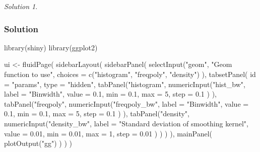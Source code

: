 \documentclass[
]{book}
\newenvironment{Shaded}{\begin{snugshade}}{\end{snugshade}}
\newcommand{\AttributeTok}[1]{\textcolor[rgb]{0.77,0.63,0.00}{#1}}
\newcommand{\DecValTok}[1]{\textcolor[rgb]{0.00,0.00,0.81}{#1}}
\newcommand{\FloatTok}[1]{\textcolor[rgb]{0.00,0.00,0.81}{#1}}
\newcommand{\FunctionTok}[1]{\textcolor[rgb]{0.00,0.00,0.00}{#1}}
\newcommand{\NormalTok}[1]{#1}
\newcommand{\OtherTok}[1]{\textcolor[rgb]{0.56,0.35,0.01}{#1}}
\newcommand{\StringTok}[1]{\textcolor[rgb]{0.31,0.60,0.02}{#1}}
\theoremstyle{definition}
\theoremstyle{definition}
\theoremstyle{definition}
\theoremstyle{definition}
\theoremstyle{remark}
\newtheorem*{solution}{Solution}
\begin{document}
\begin{solution}
\leavevmode

\hypertarget{solution-35}{%
\subsubsection*{Solution}\label{solution-35}}

\begin{Shaded}
\begin{Highlighting}[]
\FunctionTok{library}\NormalTok{(shiny)}
\FunctionTok{library}\NormalTok{(ggplot2)}

\NormalTok{ui }\OtherTok{\textless{}{-}} \FunctionTok{fluidPage}\NormalTok{(}
  \FunctionTok{sidebarLayout}\NormalTok{(}
    \FunctionTok{sidebarPanel}\NormalTok{(}
      \FunctionTok{selectInput}\NormalTok{(}\StringTok{"geom"}\NormalTok{, }\StringTok{"Geom function to use"}\NormalTok{, }
        \AttributeTok{choices =} \FunctionTok{c}\NormalTok{(}\StringTok{"histogram"}\NormalTok{, }\StringTok{"freqpoly"}\NormalTok{, }\StringTok{"density"}\NormalTok{)}
\NormalTok{      ),}
      \FunctionTok{tabsetPanel}\NormalTok{(}
        \AttributeTok{id =} \StringTok{"params"}\NormalTok{,}
        \AttributeTok{type =} \StringTok{"hidden"}\NormalTok{,}
        \FunctionTok{tabPanel}\NormalTok{(}\StringTok{"histogram"}\NormalTok{,}
          \FunctionTok{numericInput}\NormalTok{(}\StringTok{"hist\_bw"}\NormalTok{, }
            \AttributeTok{label =} \StringTok{"Binwidth"}\NormalTok{, }\AttributeTok{value =} \FloatTok{0.1}\NormalTok{, }
            \AttributeTok{min =} \FloatTok{0.1}\NormalTok{, }\AttributeTok{max =} \DecValTok{5}\NormalTok{, }\AttributeTok{step =} \FloatTok{0.1}
\NormalTok{          )}
\NormalTok{        ),}
        \FunctionTok{tabPanel}\NormalTok{(}\StringTok{"freqpoly"}\NormalTok{, }
          \FunctionTok{numericInput}\NormalTok{(}\StringTok{"freqpoly\_bw"}\NormalTok{, }
            \AttributeTok{label =} \StringTok{"Binwidth"}\NormalTok{, }\AttributeTok{value =} \FloatTok{0.1}\NormalTok{, }
            \AttributeTok{min =} \FloatTok{0.1}\NormalTok{, }\AttributeTok{max =} \DecValTok{5}\NormalTok{, }\AttributeTok{step =} \FloatTok{0.1}
\NormalTok{          )}
\NormalTok{        ),}
        \FunctionTok{tabPanel}\NormalTok{(}\StringTok{"density"}\NormalTok{,}
          \FunctionTok{numericInput}\NormalTok{(}\StringTok{"density\_bw"}\NormalTok{, }
            \AttributeTok{label =} \StringTok{"Standard deviation of smoothing kernel"}\NormalTok{,}
            \AttributeTok{value =} \FloatTok{0.01}\NormalTok{, }\AttributeTok{min =} \FloatTok{0.01}\NormalTok{, }\AttributeTok{max =} \DecValTok{1}\NormalTok{, }\AttributeTok{step =} \FloatTok{0.01}
\NormalTok{          )}
\NormalTok{        )}
\NormalTok{      )}
\NormalTok{    ),}
    \FunctionTok{mainPanel}\NormalTok{(}
      \FunctionTok{plotOutput}\NormalTok{(}\StringTok{"gg"}\NormalTok{)}
\NormalTok{    )}
\NormalTok{  )}
\NormalTok{)}


\end{Highlighting}
\end{Shaded}
\end{solution}
\end{document}
